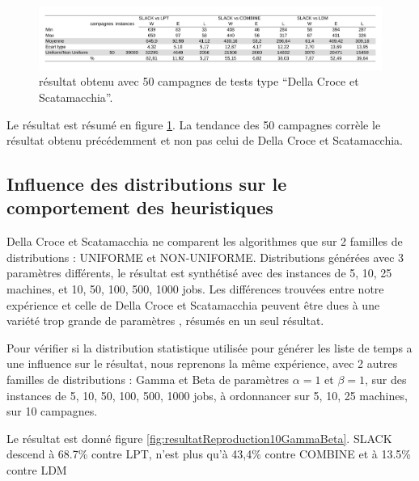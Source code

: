 \documentclass[a4paper,12pt]{report}
\theoremstyle{plain}				%
\theoremstyle{definition}				%
\begin{document}
\begin{figure}
{\centering
\includegraphics[width=\columnwidth]{4_Resultat_Reproduction50DCS.pdf}
\caption{résultat obtenu avec 50 campagnes de tests type ``Della Croce et Scatamacchia''.}
\label{fig:resultatReproduction50DellaCroceScatamacchia}
\par}
\end{figure}

Le résultat est résumé en figure \ref{fig:resultatReproduction50DellaCroceScatamacchia}. 
La tendance des 50 campagnes corrèle le résultat obtenu précédemment et non pas 
  celui de Della Croce et Scatamacchia.

\subsection{Influence des distributions sur le comportement des heuristiques}
\label{ssec:resultatsInfluenceDesDistributionSurLeComportement}


Della Croce et Scatamacchia ne comparent les algorithmes que sur 2 familles de distributions : 
UNIFORME et NON-UNIFORME. Distributions générées avec 3 paramètres différents, le résultat est synthétisé avec des instances de 5, 10, 25 machines, et 10, 50, 100, 500, 1000 jobs. 
Les différences trouvées entre notre expérience et celle de Della Croce et Scatamacchia peuvent 
être dues à une variété trop grande de paramètres , résumés en un seul résultat.

\bigskip
Pour vérifier si la distribution statistique utilisée pour générer les liste de temps 
  a une influence sur le résultat, 
  nous reprenons la même expérience, avec 2 autres familles de distributions : 
  Gamma et Beta de paramètres $\alpha = 1$ et $\beta = 1$,
  sur des instances de 5, 10, 50, 100, 500, 1000 jobs, 
  à ordonnancer sur 5, 10, 25 machines,
  sur 10 campagnes.

Le résultat est donné figure \ref{fig:resultatReproduction10GammaBeta}.
SLACK descend à 68.7\% contre LPT, 
n'est plus qu'à 43,4\% contre COMBINE et
à 13.5\% contre LDM
\end{document}
